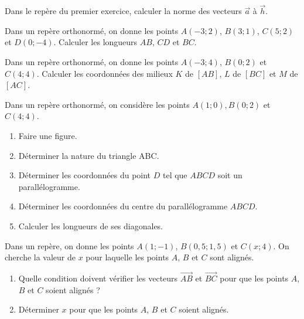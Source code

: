 \exo
Dans le repère du premier exercice, calculer la norme des vecteurs $\overrightarrow{a}$ à $\overrightarrow{h}$.

\exo
Dans un repère orthonormé, on donne les points $A(-3;2)$, $B(3;1)$, $C(5;2)$ et $D(0;-4)$.
Calculer les longueurs $AB$, $CD$ et $BC$.


\exo
Dans un repère orthonormé, on donne les points $A(-3;4)$, $B(0;2)$ et $C(4;4)$.
Calculer les coordonnées des milieux $K$ de $[AB]$, $L$ de $[BC]$ et $M$ de $[AC]$.

\exo
Dans un repère orthonormé, on considère les points $A(1;0), B(0;2)$ et $C(4;4)$. 
\begin{enumerate}
\item Faire une figure.
\item Déterminer la nature du triangle ABC.
\item Déterminer les coordonnées du point $D$ tel que $ABCD$ soit un parallélogramme.
\item Déterminer les coordonnées du centre du parallélogramme $ABCD$.
\item Calculer les longueurs de ses diagonales.
\end{enumerate}

\exo
Dans un repère, on donne les points $A(1;-1)$, $B(0,5;1,5)$ et $C(x;4)$.
On cherche la valeur de $x$ pour laquelle les points $A$, $B$ et $C$ sont alignés.
\begin{enumerate}
\item Quelle condition doivent vérifier les vecteurs $\overrightarrow{AB}$ et $\overrightarrow{BC}$ pour que les points $A$, $B$ et $C$ soient alignés ?
\item Déterminer $x$ pour que les points $A$, $B$ et $C$ soient alignés.
\end{enumerate}
